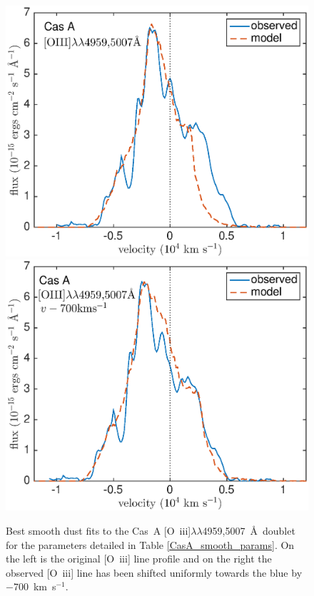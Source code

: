 \begin{figure}
\centering
\includegraphics[scale=0.43,clip=true, trim=30 0 50 20]{chapters/chapter6/figs/CasA/CasA_OIII}
\includegraphics[scale=0.43,clip=true, trim=30 0 50 20]{chapters/chapter6/figs/CasA/CasA_shifted_OIII}
\caption{Best smooth dust fits to the Cas~A [O~{\sc iii}]$\lambda\lambda$4959,5007~\AA\ doublet for the parameters detailed in Table \ref{CasA_smooth_params}.  On the left is the original [O~{\sc iii}] line profile and on the right the observed [O~{\sc iii}] line has been shifted uniformly towards the blue by $-700$~km~s$^{-1}$.}
\label{CasA_OIII}
\end{figure}

